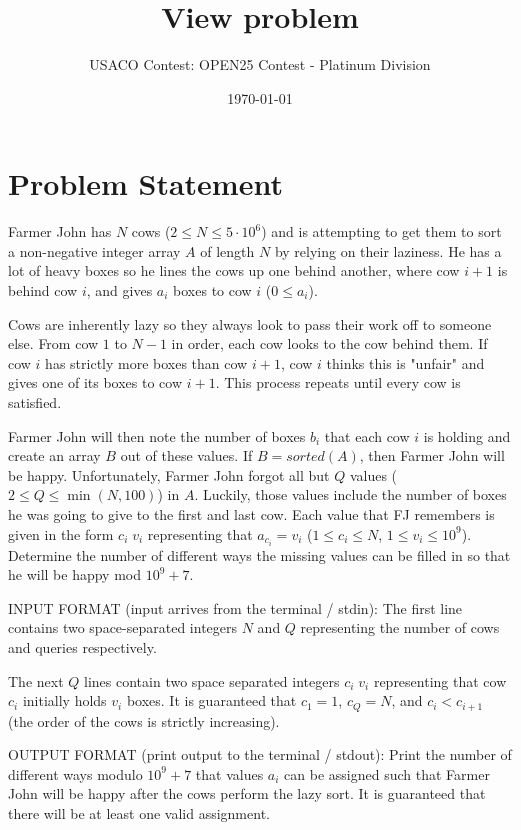 \documentclass[12pt]{article}
\title{View problem}
\author{USACO Contest: OPEN25 Contest - Platinum Division}
\date{\today}
\begin{document}
\maketitle

\section*{Problem Statement}


Farmer John has $N$ cows ($2 \leq N \leq 5\cdot 10^6$) and is attempting to get
them to sort a non-negative integer array $A$ of length $N$ by  relying on their
laziness. He has a lot of heavy boxes so he lines the cows up one behind 
another, where cow $i+1$ is behind cow $i$, and gives $a_i$ boxes to cow $i$
($0\le a_i$). 

Cows are inherently lazy so they always look to pass their work off to someone
else. From cow $1$ to $N-1$ in order, each cow looks to the cow behind them. If
cow $i$ has strictly more boxes than cow $i+1$, cow $i$ thinks this is "unfair"
and gives one of its boxes to cow $i+1$. This process repeats until every cow is
satisfied.

Farmer John will then note the number of boxes $b_i$ that each cow $i$ is
holding and create an array $B$ out of these values. If $B = sorted(A)$, then
Farmer John will be happy. Unfortunately, Farmer John forgot all but $Q$ values
($2 \leq Q \leq \min(N, 100)$) in $A$. Luckily, those values include the number
of boxes he was going to give to the first and last cow. Each value that FJ
remembers is given in the form $c_i \; v_i$ representing that $a_{c_i}=v_i$
($1 \leq c_i \leq N$, $1\le v_i\le 10^9$). Determine the number of different
ways the missing values can be filled in so that he will be happy mod $10^9+7$. 

INPUT FORMAT (input arrives from the terminal / stdin):
The first line contains two space-separated integers $N$ and $Q$ representing
the number of cows and queries respectively.

The next $Q$ lines contain two space separated integers $c_i \; v_i$
representing that cow $c_i$ initially holds $v_i$ boxes. It is guaranteed that
$c_1 = 1$, $c_Q = N$, and $c_i < c_{i+1}$ (the order of the cows is strictly
increasing).

OUTPUT FORMAT (print output to the terminal / stdout):
Print the number of different ways modulo $10^9+7$ that values $a_i$ can be
assigned such that Farmer John will be happy after the cows perform the lazy
sort. It is guaranteed that there will be at least one valid assignment. 
\end{document}
